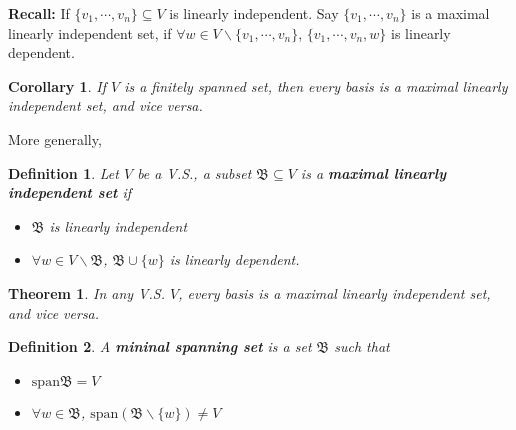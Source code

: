 \documentclass[12pt]{article}
\newtheorem{theorem}{Theorem}[subsection]
\newtheorem{definition}{Definition}[subsection]
\newtheorem{corollary}{Corollary}[subsection]
\newcommand{\Span}{\mathrm{span}}
\begin{document}
	\textbf{Recall: } If $\{v_1, \cdots, v_n\} \subseteq V$ is linearly 
	independent. Say $\{v_1, \cdots, v_n\}$ is a maximal linearly independent
	set, if $\forall w \in V\backslash \{v_1, \cdots, v_n\}$,  
	$\{v_1, \cdots, v_n, w\}$ is linearly dependent. \\

	\begin{corollary}
		If $V$ is a finitely spanned set, then every basis is a maximal
		linearly independent set, and vice versa. \\
	\end{corollary}

	More generally, 
	\begin{definition}
		Let $V$ be a V.S., a subset $\mathfrak{B} \subseteq V$ is a 
		\textbf{maximal linearly independent set} if 
		\begin{itemize}
			\item $\mathfrak{B}$ is linearly independent
			\item $\forall w \in V\backslash \mathfrak{B}$, 
				$\mathfrak{B} \cup \{w\}$ is linearly dependent.\\ 
		\end{itemize}
	\end{definition}

	\begin{theorem}
		In any V.S. $V$, every basis is a maximal linearly independent set,
		and vice versa.\\
	\end{theorem}

	\begin{definition}
		A \textbf{mininal spanning set} is a set $\mathfrak{B}$ such that
		\begin{itemize}
			\item $\Span\mathfrak{B} = V$
			\item $\forall w \in \mathfrak{B}$, $\Span(\mathfrak{B}\backslash
				\{w\}) \neq V$\\
		\end{itemize}
	\end{definition}
	
\end{document}
